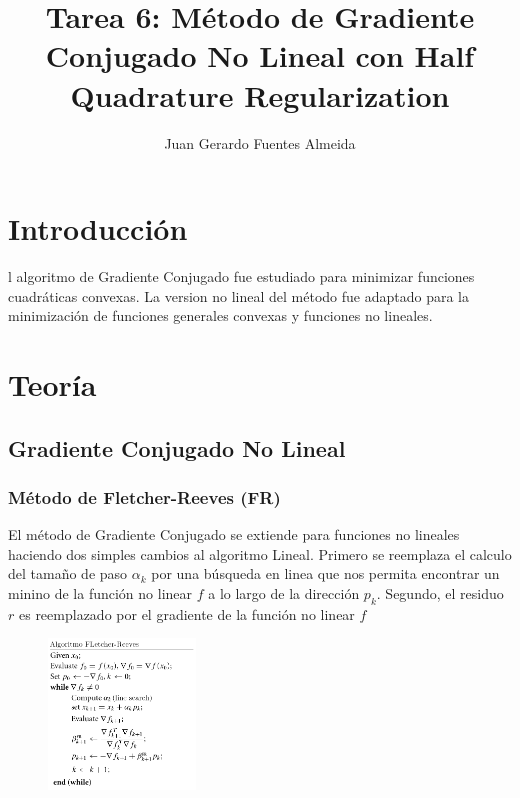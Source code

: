 \documentclass[10pt,journal,compsoc]{styles/IEEEtran}
\title{Tarea 6: M\'etodo de Gradiente Conjugado No Lineal con Half Quadrature Regularization}
\author{Juan Gerardo Fuentes Almeida}
\begin{document}
\maketitle

\IEEEdisplaynontitleabstractindextext

\IEEEpeerreviewmaketitle

\section{Introducci\'on}

l algoritmo de Gradiente Conjugado fue estudiado para minimizar funciones cuadráticas convexas. La version no lineal del método fue adaptado para la minimización de funciones generales convexas y funciones no lineales.\\
 
\section{Teoría}

\subsection{Gradiente Conjugado No Lineal}

\subsubsection{M\'etodo de Fletcher-Reeves (FR)}
El método de Gradiente Conjugado se extiende para funciones no lineales haciendo dos simples cambios al algoritmo Lineal. Primero se reemplaza el calculo del tamaño de paso $\alpha_k$ por una búsqueda en linea que nos permita encontrar un minino de la función no linear $f$ a lo largo de la dirección $p_k$. Segundo, el residuo $r$ es reemplazado por el gradiente de la función no linear $f$\\

\begin{figure}[hbtp]
\centering
\includegraphics[width=0.35\textwidth]{algoritm.png}
\caption*{}
\end{figure}
\end{document}
